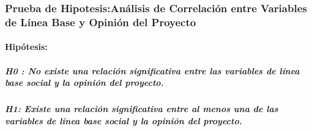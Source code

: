 \documentclass[
]{article}
\begin{document}
\subsubsection{\texorpdfstring{\textbf{Prueba de Hipotesis:Análisis de
Correlación entre Variables de Línea Base y Opinión del
Proyecto}}{Prueba de Hipotesis:Análisis de Correlación entre Variables de Línea Base y Opinión del Proyecto}}\label{prueba-de-hipotesisanuxe1lisis-de-correlaciuxf3n-entre-variables-de-luxednea-base-y-opiniuxf3n-del-proyecto}

\paragraph{Hipótesis:}\label{hipuxf3tesis}

\subparagraph{H0 : No existe una relación significativa entre las
variables de línea base social y la opinión del
proyecto.}\label{h0-no-existe-una-relaciuxf3n-significativa-entre-las-variables-de-luxednea-base-social-y-la-opiniuxf3n-del-proyecto.}

\subparagraph{H1: Existe una relación significativa entre al menos una
de las variables de línea base social y la opinión del
proyecto.}\label{h1-existe-una-relaciuxf3n-significativa-entre-al-menos-una-de-las-variables-de-luxednea-base-social-y-la-opiniuxf3n-del-proyecto.}
\end{document}

